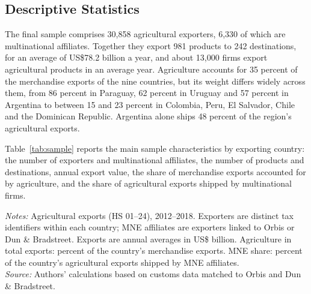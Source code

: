 \documentclass[11pt,a4paper]{article}
\newcommand{\srcnote}{\textit{Source:} Authors' calculations based on customs data matched to Orbis and Dun \& Bradstreet.}
\begin{document}
\subsection{Descriptive Statistics}\label{sec:data_desc}

The final sample comprises 30,858 agricultural exporters, 6,330 of which are multinational
affiliates. Together they export 981 products to 242 destinations, for an average of US\$78.2
billion a year, and about 13,000 firms export agricultural products in an average year. Agriculture
accounts for 35 percent of the merchandise exports of the nine countries, but its weight differs
widely across them, from 86 percent in Paraguay, 62 percent in Uruguay and 57 percent in Argentina
to between 15 and 23 percent in Colombia, Peru, El Salvador, Chile and the Dominican Republic.
Argentina alone ships 48 percent of the region's agricultural exports.

Table~\ref{tab:sample} reports the main sample characteristics by exporting country: the number
of exporters and multinational affiliates, the number of products and destinations, annual export
value, the share of merchandise exports accounted for by agriculture, and the share of agricultural
exports shipped by multinational firms.
\begin{table}[H]\centering\footnotesize%
  \caption{Agricultural Exports, by Exporting Country}%
  \label{tab:sample}%
  \par\vspace{3pt}%
  \begin{minipage}{0.95\textwidth}\footnotesize %
  \textit{Notes:} Agricultural exports (HS 01--24), 2012--2018. Exporters are distinct tax identifiers within each country; MNE affiliates are exporters linked to Orbis or Dun \& Bradstreet. Exports are annual averages in US\$ billion. Agriculture in total exports: percent of the country's merchandise exports. MNE share: percent of the country's agricultural exports shipped by MNE affiliates.\\[3pt]%
  \srcnote%
  \end{minipage}%
  \end{table}
\end{document}
